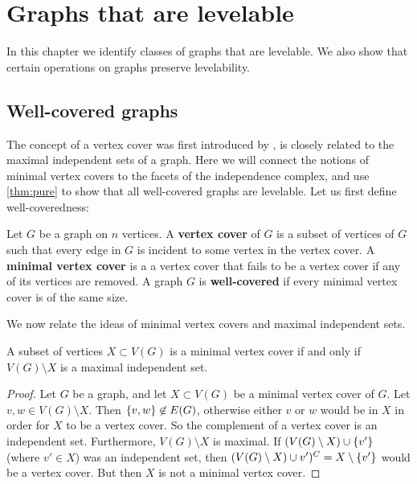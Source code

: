 \chapter{Graphs that are levelable} %

\label{ch:levelable-results} %

In this chapter we identify classes of graphs that are levelable. We also show that certain operations on graphs preserve levelability.

\section{Well-covered graphs}

The concept of a vertex cover was first introduced by \cite{Plummer1970}, is closely related to the maximal independent sets of a graph. Here we will connect the notions of minimal vertex covers to the facets of the independence complex, and use \autoref{thm:pure} to show that all well-covered graphs are levelable. Let us first define well-coveredness:

\begin{definition}
Let $G$ be a graph on $n$ vertices. A \textbf{vertex cover} of $G$ is a subset of vertices of $G$ such that every edge in $G$ is incident to some vertex in the vertex cover. A \textbf{minimal vertex cover} is a a vertex cover that fails to be a vertex cover if any of its vertices are removed. A graph $G$ is \textbf{well-covered} if every minimal vertex cover is of the same size. 
\end{definition}

We now relate the ideas of minimal vertex covers and maximal independent sets.

\begin{lemma}
A subset of vertices $X \subset V(G)$ is a minimal vertex cover if and only if $V(G) \setminus X$ is a maximal independent set. 
\end{lemma}
\begin{proof}
Let $G$ be a graph, and let $X \subset V(G)$ be a minimal vertex cover of $G$. Let $v, w \in V(G) \setminus X$. Then $\{ v, w \} \not \in E(G)$, otherwise either $v$ or $w$ would be in $X$ in order for $X$ to be a vertex cover. So the complement of a vertex cover is an independent set. Furthermore, $V(G) \setminus X$ is maximal. If $(V(G) \setminus X)\cup\{ v' \}$ (where $v' \in X$) was an independent set, then $(V(G) \setminus X) \cup {v'})^C = X \setminus \{ v' \}$ would be a vertex cover. But then $X$ is not a minimal vertex cover. 
\end{proof}

